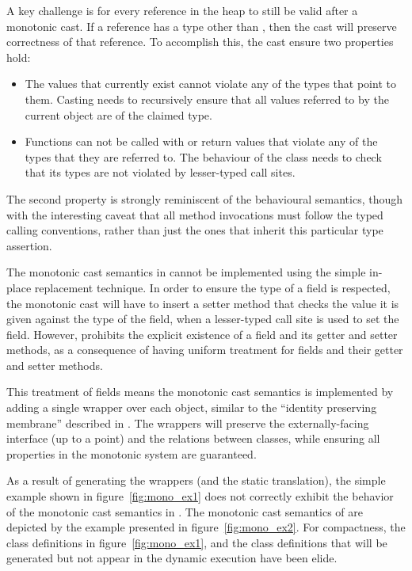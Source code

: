\documentclass[a4paper,USenglish]{tex/lipics-v2016}
\begin{document}
A key challenge is for every reference in the heap \s to still be valid after a monotonic
cast. If a reference has a type other than \any, then the cast will preserve correctness of that
reference. To accomplish this, the cast ensure two properties hold:
\begin{itemize}
\item The values that currently exist cannot violate any of the types
  that point to them. Casting needs to recursively ensure that all values
  referred to by the current object are of the claimed type.
\item Functions can not be called with or return values that violate any of
  the types that they are referred to. The behaviour of the class needs
  to check that its types are not violated by lesser-typed call sites.
\end{itemize}
The second property is strongly reminiscent of the behavioural semantics,
though with the interesting caveat that all method invocations 
must follow the typed calling conventions, rather
than just the ones that inherit this particular type assertion.

The monotonic cast semantics in \kafka cannot be implemented using the simple 
in-place replacement technique\cite{Siek2015}. In order to ensure the
type of a field is respected, the monotonic cast will have to insert a setter method
that checks the value it is given against the type of the field, when
a lesser-typed call site is used to set the field. However, \kafka prohibits
the explicit existence of a field and its getter and setter methods, 
as a consequence of having uniform treatment for fields and their getter and setter methods. 

This treatment of fields means the monotonic cast semantics is implemented by adding a 
single wrapper over each object, similar to the ``identity preserving membrane''
described in \cite{keil_et_al:DARTS:2015:5511}. The wrappers will preserve the
externally-facing interface (up to a point) and the relations between classes,
while ensuring all properties in the monotonic system are guaranteed.

As a result of generating the wrappers (and the static translation), the simple example 
shown in figure~\ref{fig:mono_ex1} does not correctly exhibit the behavior of the 
monotonic cast semantics in \kafka. The monotonic cast semantics of \kafka are
depicted by the example presented in figure~\ref{fig:mono_ex2}.
For compactness, the class definitions in figure~\ref{fig:mono_ex1}, and the class definitions that will be generated but
not appear in the dynamic execution have been elide.
\end{document}
